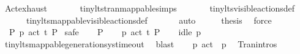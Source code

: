 \begin{isabellebody}
\ Act{\isachardot}{\kern0pt}exhaust\ \isanewline
\ \ \ \ \ \ tiny{\isacharunderscore}{\kern0pt}lts{\isachardot}{\kern0pt}tran{\isacharunderscore}{\kern0pt}mappable{\isachardot}{\kern0pt}simps\ \isanewline
\ \ \ \ \ \ tiny{\isacharunderscore}{\kern0pt}lts{\isachardot}{\kern0pt}visible{\isacharunderscore}{\kern0pt}actions{\isacharunderscore}{\kern0pt}def\ \isanewline
\ \ \ \ \ \ tiny{\isacharunderscore}{\kern0pt}lts{\isacharunderscore}{\kern0pt}mappable{\isachardot}{\kern0pt}visible{\isacharunderscore}{\kern0pt}actions{\isacharunderscore}{\kern0pt}def\ \isanewline
\ \ \ \ \isamarkupfalse%
\ auto\isanewline
\ \ \isamarkupfalse%
\ \isamarkupfalse%
\ {\isacharquery}{\kern0pt}thesis\ \isamarkupfalse%
\ force\isanewline
{}\isamarkupfalse%
\isanewline
\isanewline
{}\isamarkupfalse%
\ {\isacartoucheopen}{\isasymnexists}\ P{\isacharprime}{\kern0pt}{\isachardot}{\kern0pt}\ {\isasymtheta}{\isacharbrackleft}{\kern0pt}{\isasymemptyset}{\isacharbrackright}{\kern0pt}{\isacharparenleft}{\kern0pt}p{}{\isacharparenright}{\kern0pt}\ {\isasymlongmapsto}\isactrlsup {\isasymtheta}{\isacharparenleft}{\kern0pt}act\ t{\isacharparenright}{\kern0pt}\ P{\isacharprime}{\kern0pt}{\isacartoucheclose}\isanewline
{}\isamarkupfalse%
\ safe\isanewline
\ \ \isamarkupfalse%
\ P{\isacharprime}{\kern0pt}\isanewline
\ \ \isamarkupfalse%
\ {\isacartoucheopen}{\isasymtheta}{\isacharbrackleft}{\kern0pt}{\isasymemptyset}{\isacharbrackright}{\kern0pt}{\isacharparenleft}{\kern0pt}p{}{\isacharparenright}{\kern0pt}\ {\isasymlongmapsto}\isactrlsup {\isasymtheta}{\isacharparenleft}{\kern0pt}act\ t{\isacharparenright}{\kern0pt}\ P{\isacharprime}{\kern0pt}{\isacartoucheclose}\isanewline
\ \ \isamarkupfalse%
\ {\isacartoucheopen}idle\ p{}\ {\isasymemptyset}{\isacartoucheclose}\ \isanewline
\ \ \ \ \isamarkupfalse%
\ tiny{\isacharunderscore}{\kern0pt}lts{\isacharunderscore}{\kern0pt}mappable{\isachardot}{\kern0pt}generation{\isacharunderscore}{\kern0pt}sys{\isacharunderscore}{\kern0pt}timeout\ \isamarkupfalse%
\ blast\isanewline
\isanewline
\ \ \isamarkupfalse%
\ {\isacartoucheopen}p{}\ {\isasymlongmapsto}{\isacharparenleft}{\kern0pt}act\ {\isasymtau}{\isacharparenright}{\kern0pt}\ p{}{\isacartoucheclose}\ \isamarkupfalse%
\ Tran{\isachardot}{\kern0pt}intros{\isacharparenleft}{\kern0pt}{}{\isacharparenright}{\kern0pt}\isanewline

\end{isabellebody}
